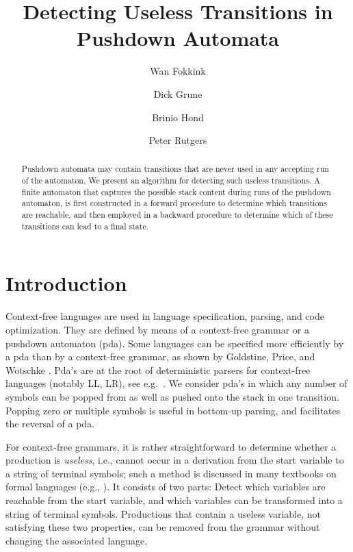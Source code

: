 \documentclass{llncs}
\begin{document}
\mainmatter

\title{Detecting Useless Transitions in Pushdown Automata}

\author{Wan Fokkink \and Dick Grune \and Brinio Hond \and Peter Rutgers}

\maketitle

\begin{abstract}
Pushdown automata may contain transitions that are never used in any accepting run of the automaton.
We present an algorithm for detecting such useless transitions.
A finite automaton that captures the possible stack content during runs of the pushdown automaton,
is first constructed in a forward procedure to determine which transitions are reachable, and then
employed in a backward procedure to determine which of these transitions can lead to a final state.
\end{abstract}


\section{Introduction}\label{sec:intro2}

Context-free languages are used in language specification, parsing, and code optimization.
They are defined by means of a context-free grammar or a pushdown automaton (pda).
Some languages can be specified more efficiently by a pda
than by a context-free grammar, as shown by Goldstine, Price, and Wotschke \cite{GoldstinePW82econ}.
Pda's are at the root of deterministic parsers for context-free languages (notably LL, LR),
see e.g.\ \cite{Substring.Nederhof.1996,LR.Bertsch.1999}.
We consider pda's in which any number of symbols can be popped
from as well as pushed onto the stack in one transition.
Popping zero or multiple symbols is useful in bottom-up parsing, and facilitates the reversal of a pda.


For context-free grammars, it is rather straightforward to determine
whether a production is \emph{useless}, i.e., cannot occur in a derivation from
the start variable to a string of terminal symbols; such a method is discussed
in many textbooks on formal languages (e.g., \cite[Theorem 6.2]{Linz11}).
It consists of two parts: Detect which variables are reachable from the start variable,
and which variables can be transformed into a string of terminal symbols.
Productions that contain a useless variable, not satisfying these two properties,
can be removed from the grammar without changing the associated language.
\end{document}
